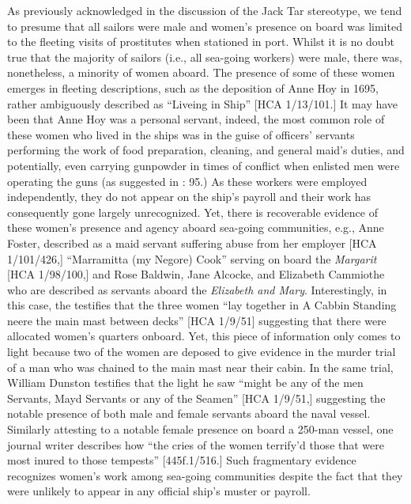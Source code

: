   As previously acknowledged in the discussion of the Jack Tar stereotype, we tend to presume that all sailors were male and women’s presence on board was limited to the fleeting visits of prostitutes when stationed in port. Whilst it is no doubt true that the majority of sailors (i.e., all sea-going workers) were male, there was, nonetheless, a minority of women aboard. The presence of some of these women emerges in fleeting descriptions, such as the deposition of Anne Hoy in 1695, rather ambiguously described as “Liveing in Ship” [HCA 1/13/101.]  It may have been that Anne Hoy was a personal servant, indeed, the most common role of these women who lived in the ships was in the guise of officers’ servants performing the work of food preparation, cleaning, and general maid’s duties, and potentially, even carrying gunpowder in times of conflict when enlisted men were operating the guns (as suggested in \citealt{Brown2011}: 95.) As these workers were employed independently, they do not appear on the ship’s payroll and their work has consequently gone largely unrecognized. Yet, there is recoverable evidence of these women’s presence and agency aboard sea-going communities, e.g., Anne Foster, described as a maid servant suffering abuse from her employer [HCA 1/101/426,] “Marramitta (my Negore) Cook” serving on board the \textit{Margarit} [HCA 1/98/100,] and Rose Baldwin, Jane Alcocke, and Elizabeth Cammiothe who are described as servants aboard the \textit{Elizabeth and Mary}. Interestingly, in this case, the  testifies that the three women “lay together in A Cabbin Standing neere the main mast between decks” [HCA 1/9/51] suggesting that there were allocated women’s quarters onboard. Yet, this piece of information only comes to light because two of the women are deposed to give evidence in the murder trial of a man who was chained to the main mast near their cabin. In the same trial, William Dunston testifies that the light he saw “might be any of the men Servants, Mayd Servants or any of the Seamen” [HCA 1/9/51,] suggesting the notable presence of both male and female servants aboard the naval vessel. Similarly attesting to a notable female presence on board a 250-man vessel, one journal writer describes how “the cries of the women terrify’d those that were most inured to those tempests” [445f.1/516.] Such fragmentary evidence recognizes women’s work among sea-going communities despite the fact that they were unlikely to appear in any official ship’s muster or payroll. 


